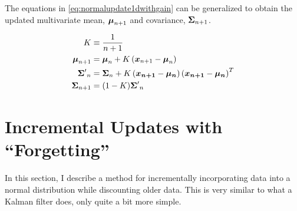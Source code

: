 \documentclass[../../main.tex]{subfiles}
\begin{document}
The equations in \eqref{eq:normalupdate1dwithgain} can be generalized to
obtain the updated multivariate mean, $\boldsymbol{\mu}_{n+1}$ and covariance,
$\boldsymbol{\Sigma}_{n+1}$.

\begin{align}
    \label{eq:normalupdatemulti}
    K &\equiv \frac{1}{n + 1}\\
    \boldsymbol{\mu}_{n+1} &= \boldsymbol{\mu}_{n} +
                          K \left(
                              \boldsymbol{x}_{n+1} - \boldsymbol{\mu}_{n}
                          \right) \nonumber\nonumber\\
    {\boldsymbol{\Sigma}'}_{n} &= \boldsymbol{\Sigma}_{n}
                          + K\left( \boldsymbol{x_{n+1}} - \boldsymbol{\mu_n}  \right)
                          \left( \boldsymbol{x_{n+1}} - \boldsymbol{\mu_n} \right)^T\nonumber\\
    {\boldsymbol{\Sigma}}_{n+1} &= (1 - K) {\boldsymbol{\Sigma}'}_{n}\nonumber
\end{align}

\section{Incremental Updates with ``Forgetting''}
In this section, I describe a method for incrementally incorporating data into
a normal distribution while discounting older data.  This is very similar to
what a Kalman filter does, only quite a bit more simple.
\end{document}
